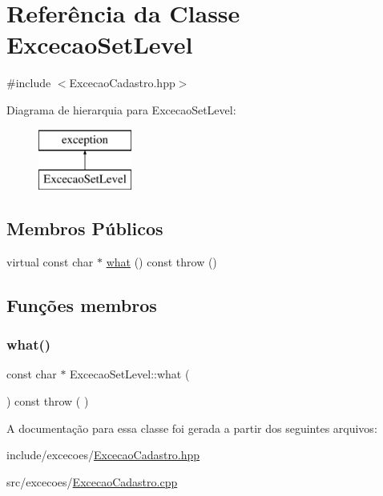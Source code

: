 \hypertarget{class_excecao_set_level}{}\section{Referência da Classe Excecao\+Set\+Level}
\label{class_excecao_set_level}


{\ttfamily \#include $<$Excecao\+Cadastro.\+hpp$>$}

Diagrama de hierarquia para Excecao\+Set\+Level\+:\begin{figure}[H]
\begin{center}
\leavevmode
\includegraphics[height=2.000000cm]{class_excecao_set_level}
\end{center}
\end{figure}
\subsection*{Membros Públicos}
\begin{DoxyCompactItemize}
\item 
virtual const char $\ast$ \mbox{\hyperlink{class_excecao_set_level_a72edce99a153ca6492449848d3e5d4aa}{what}} () const  throw ()
\end{DoxyCompactItemize}


\subsection{Funções membros}
\mbox{\label{class_excecao_set_level_a72edce99a153ca6492449848d3e5d4aa}} 
\subsubsection{\texorpdfstring{what()}{what()}}
{\footnotesize\ttfamily const char $\ast$ Excecao\+Set\+Level\+::what (\begin{DoxyParamCaption}{ }\end{DoxyParamCaption}) const throw ( ) \hspace{0.3cm}{\ttfamily [virtual]}}



A documentação para essa classe foi gerada a partir dos seguintes arquivos\+:\begin{DoxyCompactItemize}
\item 
include/excecoes/\mbox{\hyperlink{_excecao_cadastro_8hpp}{Excecao\+Cadastro.\+hpp}}\item 
src/excecoes/\mbox{\hyperlink{_excecao_cadastro_8cpp}{Excecao\+Cadastro.\+cpp}}\end{DoxyCompactItemize}
